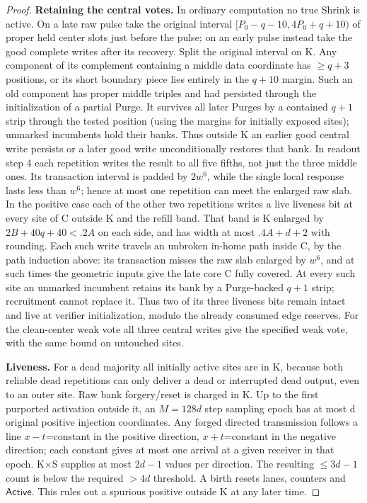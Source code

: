 \begin{proof}
\textbf{Retaining the central votes.} In ordinary computation no true Shrink is active. On a late raw pulse take the original interval \([P_0- q- 10,4P_0+q+10)\) of proper held center slots just before the pulse; on an early pulse instead take the good complete writes after its recovery. Split the original interval on K. Any component of its complement containing a middle data coordinate has \(\ge\)\(q+3\) positions, or its short boundary piece lies entirely in the \(q+10\) margin. Such an old component has proper middle triples and had persisted through the initialization of a partial Purge. It survives all later Purges by a contained \(q+1\) strip through the tested position (using the margins for initially exposed sites); unmarked incumbents hold their banks. Thus outside K an earlier good central write persists or a later good write unconditionally restores that bank. In readout step 4 each repetition writes the result to all five fifths, not just the three middle ones. Its transaction interval is padded by \(2w^6\), while the single local response lasts less than \(w^6\); hence at most one repetition can meet the enlarged raw slab. In the positive case each of the other two repetitions writes a live liveness bit at every site of C outside K and the refill band. That band is K enlarged by \(2B+40q+40<.2A\) on each side, and has width at most \(.4A+d+2\) with rounding. Each such write travels an unbroken in-home path inside C, by the path induction above: its transaction misses the raw slab enlarged by \(w^6\), and at such times the geometric inputs give the late core C fully covered. At every such site an unmarked incumbent retains its bank by a Purge-backed \(q+1\) strip; recruitment cannot replace it. Thus two of its three liveness bits remain intact and live at verifier initialization, modulo the already consumed edge reserves. For the clean-center weak vote all three central writes give the specified weak vote, with the same bound on untouched sites.

\textbf{Liveness.} For a dead majority all initially active sites are in K, because both reliable dead repetitions can only deliver a dead or interrupted dead output, even to an outer site. Raw bank forgery/reset is charged in K. Up to the first purported activation outside it, an \(M=128d\) step sampling epoch has at most d original positive injection coordinates. Any forged directed transmission follows a line \(x- t\)=constant in the positive direction, \(x+t\)=constant in the negative direction; each constant gives at most one arrival at a given receiver in that epoch. K\(\times\)S supplies at most \(2d- 1\) values per direction. The resulting \(\le\)\(3d- 1\) count is below the required \(>4d\) threshold. A birth resets lanes, counters and \(\mathsf{Active}\). This rules out a spurious positive outside K at any later time.


\end{proof}
